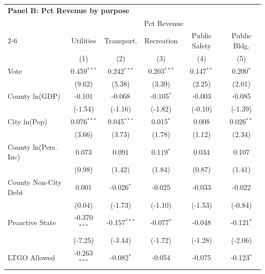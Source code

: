 \begingroup
\centering
\begin{tabular*}{\textwidth}{@{\extracolsep{\fill}}lccccc}
\multicolumn{5}{l}{\textbf{Panel B: Pct Revenue by purpose}}\\

\addlinespace
   \toprule
    & \multicolumn{5}{c}{Pct Revenue}\\
   \cmidrule(lr){2-6}
                               & Utilities      & Transport.     & Recreation    & Public Safety & Public Bldg. \\   
                               & (1)            & (2)            & (3)           & (4)           & (5)\\  
   \midrule 
   Vote                        & 0.459$^{***}$  & 0.242$^{***}$  & 0.203$^{***}$ & 0.147$^{**}$  & 0.200$^{*}$\\   
                               & (9.62)        & (5.38)        & (3.39)       & (2.25)       & (2.01)\\   
   County ln(GDP)              & -0.101         & -0.068         & -0.105$^{*}$  & -0.003        & -0.085\\   
                               & (-1.54)       & (-1.16)       & (-1.82)      & (-0.10)      & (-1.39)\\   
   City ln(Pop)                & 0.076$^{***}$  & 0.045$^{***}$  & 0.015$^{*}$   & 0.008         & 0.026$^{**}$\\   
                               & (3.66)        & (3.73)        & (1.78)       & (1.12)       & (2.34)\\   
   County ln(Pers. Inc)        & 0.073          & 0.091          & 0.119$^{*}$   & 0.034         & 0.107\\   
                               & (0.98)        & (1.42)        & (1.84)       & (0.87)       & (1.41)\\   
   County Non-City Debt        & 0.001          & -0.026$^{*}$   & -0.025        & -0.033        & -0.022\\   
                               & (0.04)        & (-1.73)       & (-1.10)      & (-1.53)      & (-0.84)\\   
   Proactive State             & -0.370$^{***}$ & -0.157$^{***}$ & -0.077$^{*}$  & -0.048        & -0.121$^{*}$\\   
                               & (-7.25)       & (-3.44)       & (-1.72)      & (-1.28)      & (-2.06)\\   
   LTGO Allowed                & -0.263$^{***}$ & -0.082$^{*}$   & -0.054        & -0.075        & -0.123$^{*}$\\   

\end{tabular*}
